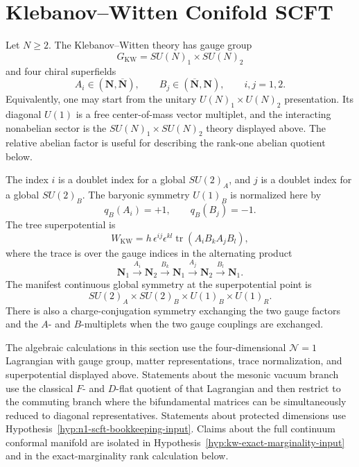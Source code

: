 \section{Klebanov--Witten Conifold SCFT}
\label{sec:n1-klebanov-witten-conifold}

Let \(N\geq2\).  The Klebanov--Witten theory has gauge group
\[
  G_{\mathrm{KW}}=SU(N)_1\times SU(N)_2
\]
and four chiral superfields
\[
  A_i\in(\mathbf N,\overline{\mathbf N}),\qquad
  B_j\in(\overline{\mathbf N},\mathbf N),
  \qquad i,j=1,2 .
\]
Equivalently, one may start from the unitary
\(U(N)_1\times U(N)_2\) presentation.  Its diagonal \(U(1)\) is a free
center-of-mass vector multiplet, and the interacting nonabelian sector is
the \(SU(N)_1\times SU(N)_2\) theory displayed above.  The relative abelian
factor is useful for describing the rank-one abelian quotient below.

The index \(i\) is a doublet index for a global \(SU(2)_A\), and \(j\) is a
doublet index for a global \(SU(2)_B\).  The baryonic symmetry \(U(1)_B\) is
normalized here by
\[
  q_B(A_i)=+1,\qquad q_B(B_j)=-1 .
\]
The tree superpotential is
\begin{equation}
  W_{\mathrm{KW}}
  =
  h\,\epsilon^{ij}\epsilon^{kl}
  \operatorname{tr}(A_iB_kA_jB_l),
  \label{eq:kw-superpotential}
\end{equation}
where the trace is over the gauge indices in the alternating product
\[
  \mathbf N_1\xrightarrow{A_i}\mathbf N_2
  \xrightarrow{B_k}\mathbf N_1
  \xrightarrow{A_j}\mathbf N_2
  \xrightarrow{B_l}\mathbf N_1 .
\]
The manifest continuous global symmetry at the superpotential point is
\[
  SU(2)_A\times SU(2)_B\times U(1)_B\times U(1)_R .
\]
There is also a charge-conjugation symmetry exchanging the two gauge factors
and the \(A\)- and \(B\)-multiplets when the two gauge couplings are
exchanged.

\begin{hypothesis}
\label{hyp:kw-lagrangian-branch-assumptions}
The algebraic calculations in this section use the four-dimensional
\(\mathcal N=1\) Lagrangian with gauge group, matter representations, trace
normalization, and superpotential displayed above.  Statements about the
mesonic vacuum branch use the classical \(F\)- and \(D\)-flat quotient of
that Lagrangian and then restrict to the commuting branch where the
bifundamental matrices can be simultaneously reduced to diagonal
representatives.  Statements about protected dimensions use
Hypothesis~\ref{hyp:n1-scft-bookkeeping-input}.  Claims about the full
continuum conformal manifold are isolated in
Hypothesis~\ref{hyp:kw-exact-marginality-input} and in the
exact-marginality rank calculation below.
\end{hypothesis}

